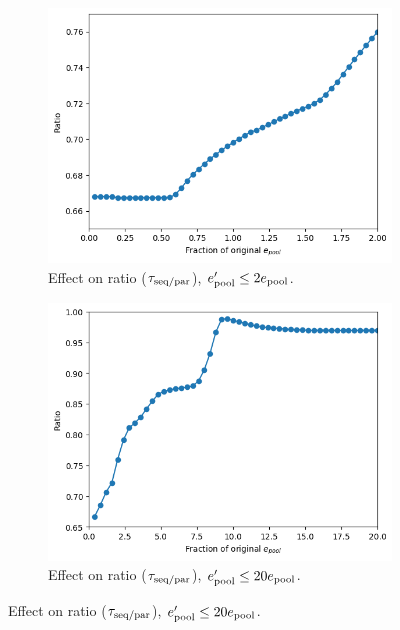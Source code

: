 \begin{figure}
  \centering
  \begin{subfigure}[htpb]{0.45\textwidth}
   \centering
   \includegraphics[width=\textwidth]{epool_ec_ratio_shrinkyaxis}
   \caption{
     Effect on ratio ($\tau_{\mathrm{seq}/\mathrm{par}}$), $e_{\mathrm{pool}}^{\prime} \leq 2e_{\mathrm{pool}}$.
   }
   \label{fig:model-pool-ratio}
  \end{subfigure}%
  \begin{subfigure}[htpb]{0.45\textwidth}
   \centering
   \includegraphics[width=\textwidth]{epool_ec_ratio_20_shrinkyaxis}
   \caption{
     Effect on ratio ($\tau_{\mathrm{seq}/\mathrm{par}}$), $e_{\mathrm{pool}}^{\prime} \leq 20e_{\mathrm{pool}}$.
   }
   \label{fig:model-pool-ratio-20}
  \end{subfigure}


\end{figure}
